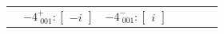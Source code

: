 \documentclass[fleqn,8pt,landscape]{jsarticle}
\begin{document}
\begin{longtable}{ccccccc}
& $ -4^{+}_{\,\,001}:\begin{bmatrix} - i \end{bmatrix} $ & $ -4^{-}_{\,\,001}:\begin{bmatrix} i \end{bmatrix} $ & $  $ & $  $ & $  $ & $  $ \\
\end{longtable}
\end{document}

